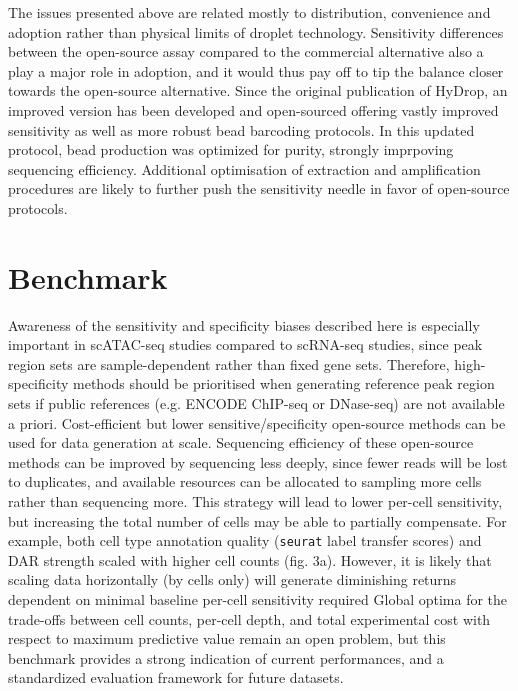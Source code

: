 The issues presented above are related mostly to distribution, convenience and adoption rather than physical limits of droplet technology. Sensitivity differences between the open-source assay compared to the commercial alternative also a play a major role in adoption, and it would thus pay off to tip the balance closer towards the open-source alternative. Since the original publication of HyDrop, an improved version has been developed and open-sourced offering vastly improved sensitivity as well as more robust bead barcoding protocols. In this updated protocol, bead production was optimized for purity, strongly imprpoving sequencing efficiency. Additional optimisation of extraction and amplification procedures are likely to further push the sensitivity needle in favor of open-source protocols.

\section{Benchmark}
Awareness of the sensitivity and specificity biases described here is especially important in scATAC-seq studies compared to scRNA-seq studies, since peak region sets are sample-dependent rather than fixed gene sets. Therefore, high-specificity methods should be prioritised when generating reference peak region sets if public references (e.g. ENCODE ChIP-seq or DNase-seq) are not available a priori. Cost-efficient but lower sensitive/specificity open-source methods can be used for data generation at scale. Sequencing efficiency of these open-source methods can be improved by sequencing less deeply, since fewer reads will be lost to duplicates, and available resources can be allocated to sampling more cells rather than sequencing more. This strategy will lead to lower per-cell sensitivity, but increasing the total number of cells may be able to partially compensate. For example, both cell type annotation quality (\verb|seurat| label transfer scores) and DAR strength scaled with higher cell counts (fig. 3a). However, it is likely that scaling data horizontally (by cells only) will generate diminishing returns dependent on minimal baseline per-cell sensitivity required Global optima for the trade-offs between cell counts, per-cell depth, and total experimental cost with respect to maximum predictive value remain an open problem, but this benchmark provides a strong indication of current performances, and a standardized evaluation framework for future datasets.

